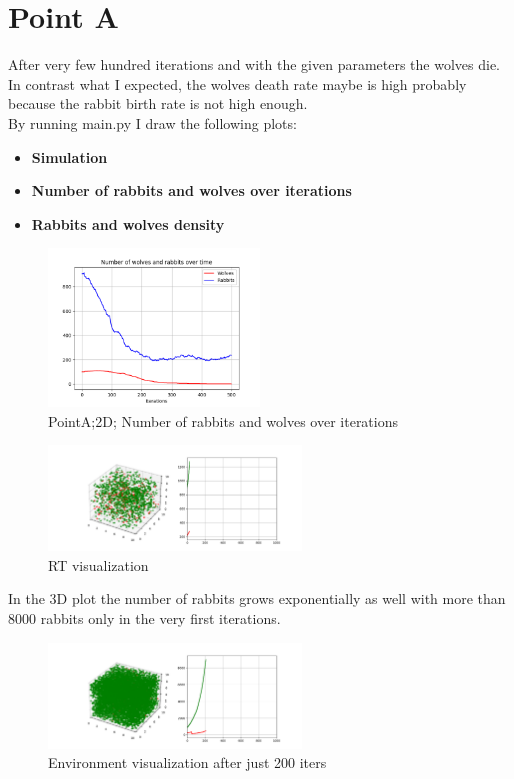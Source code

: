 \documentclass[unicode,11pt,a4paper,oneside,numbers=endperiod,openany]{scrartcl}
\begin{document}
\section*{Point A}
 After very few hundred iterations and with the given parameters the wolves die. In contrast what I expected, the wolves death rate maybe is high probably because the rabbit birth rate is not high enough.\\
By running main.py I draw the following plots:
\begin{itemize}
  \item \textbf{Simulation}
  \item \textbf{Number of rabbits and wolves over iterations}
  \item \textbf{Rabbits and wolves density}
\end{itemize}
\begin{figure}[H]
  \centering
  \includegraphics[width=0.5\textwidth]{output_main/PointA.png}
  \caption{PointA;2D; Number of rabbits and wolves over iterations}
\end{figure}
\begin{figure}[H]
  \centering
  \includegraphics[width=0.6\textwidth]{output3D/3DInitCondition.png}
  \caption{RT visualization}
\end{figure}
In the 3D plot the number of rabbits grows exponentially as well with more than 8000 rabbits only in the very first iterations. 
\begin{figure}[H]
  \centering
  \includegraphics[width=0.6\textwidth]{output3D/secondPlotPointA.png}
  \caption{Environment visualization after just 200 iters} 
\end{figure}
\end{document}
